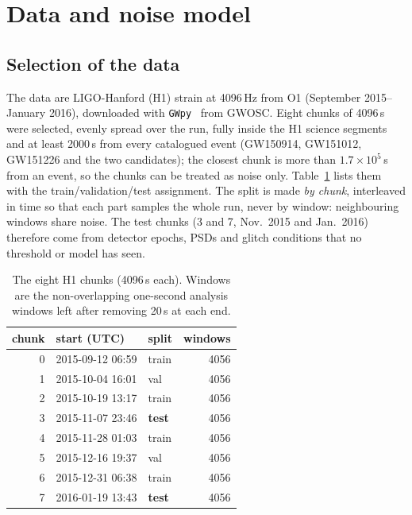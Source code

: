 \section{Data and noise model}\label{sec:data}

\subsection{Selection of the data}
The data are LIGO-Hanford (H1) strain at 4096\,Hz from O1 (September 2015--January 2016), downloaded with \texttt{GWpy}~\cite{gwpy} from GWOSC. Eight chunks of 4096\,s were selected, evenly spread over the run, fully inside the
H1 science segments and at least 2000\,s from every catalogued event (GW150914, GW151012, GW151226 and the two candidates); the closest chunk is more than $1.7\times10^5$\,s from an event, so the chunks can be treated as noise only.
Table~\ref{tab:chunks} lists them with the train/validation/test assignment. The split is made \emph{by chunk}, interleaved in time so that each part samples the whole run, never by window: neighbouring windows share noise.
The test chunks (3 and 7, Nov.\ 2015 and Jan.\ 2016) therefore come from detector epochs, PSDs and glitch conditions that no threshold or model has seen.

\begin{table}[h]\centering\small
\begin{tabular}{rllr}
\toprule
chunk & start (UTC) & split & windows\\
\midrule
0 & 2015-09-12 06:59 & train & 4056\\
1 & 2015-10-04 16:01 & val & 4056\\
2 & 2015-10-19 13:17 & train & 4056\\
3 & 2015-11-07 23:46 & \textbf{test} & 4056\\
4 & 2015-11-28 01:03 & train & 4056\\
5 & 2015-12-16 19:37 & val & 4056\\
6 & 2015-12-31 06:38 & train & 4056\\
7 & 2016-01-19 13:43 & \textbf{test} & 4056\\
\bottomrule
\end{tabular}
\caption{The eight H1 chunks (4096\,s each). Windows are the non-overlapping one-second analysis windows left after removing 20\,s at each end.}\label{tab:chunks}
\end{table}

